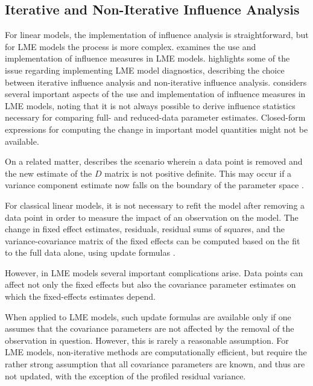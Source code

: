 \documentclass[12pt, a4paper]{report}
\theoremstyle{plain}
\theoremstyle{definition}
\theoremstyle{remark}
\begin{document}
\subsection{Iterative and Non-Iterative Influence Analysis}
	
	
	
	
	For linear models, the implementation of influence analysis is straightforward, but for LME models the process is more complex. \citet{schabenberger} examines the use and implementation of
	influence measures in LME models. \citet{schabenberger} highlights some of the issue regarding implementing LME model diagnostics, describing  the choice between  iterative influence analysis and  non-iterative influence analysis.
	\citet{schabenberger} considers several important aspects of the use and implementation of influence measures in LME models, noting that it is not always possible to
	derive influence statistics necessary for comparing full- and reduced-data parameter estimates. Closed-form expressions for computing the change in important model quantities might not be available.
	
On a related matter, \citet{schabenberger} describes the scenario wherein a data point is removed and the new estimate of the $D$ matrix is not positive definite. This may occur if a variance component
	estimate now falls on the boundary of the parameter space \citep{schabenberger}. 
	
For classical linear models, it is not necessary to refit the model after removing a data point in order to measure the impact of an observation on the model. The change in fixed effect estimates, residuals, residual sums of squares, and the variance-covariance matrix of the fixed effects can be computed based on the fit to the full data alone, using update formulas \citep{sherman, hager1989}.
	
	
However, in LME models several important complications arise. Data points can affect not only the fixed effects but also the covariance parameter estimates on which the fixed-effects estimates depend.
	
When applied to LME models, such update formulas are available only if one assumes that the covariance parameters are not affected by the removal of the observation in question. However, this is rarely a reasonable assumption.
	For LME models, non-iterative methods are computationally efficient, but require the rather strong assumption that all 
	covariance parameters are known, and thus are not updated, with the exception of the profiled residual variance.
	
\end{document}
